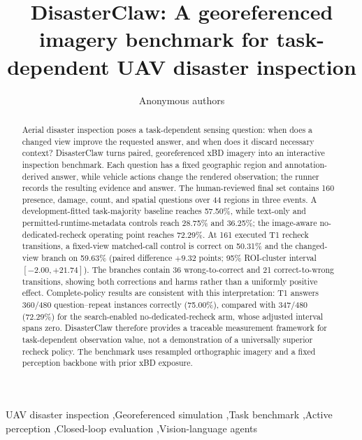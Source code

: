\documentclass[preprint,12pt,a4paper]{elsarticle}
\begin{document}
\begin{frontmatter}
\title{DisasterClaw: A georeferenced imagery benchmark for task-dependent UAV disaster inspection}
\author{Anonymous authors}
\begin{abstract}
Aerial disaster inspection poses a task-dependent sensing question: when does a changed view improve the requested answer, and when does it discard necessary context? DisasterClaw turns paired, georeferenced xBD imagery into an interactive inspection benchmark. Each question has a fixed geographic region and annotation-derived answer, while vehicle actions change the rendered observation; the runner records the resulting evidence and answer. The human-reviewed final set contains 160 presence, damage, count, and spatial questions over 44 regions in three events. A development-fitted task-majority baseline reaches 57.50\%, while text-only and permitted-runtime-metadata controls reach 28.75\% and 36.25\%; the image-aware no-dedicated-recheck operating point reaches 72.29\%. At 161 executed T1 recheck transitions, a fixed-view matched-call control is correct on 50.31\% and the changed-view branch on 59.63\% (paired difference $+9.32$ points; 95\% ROI-cluster interval $[-2.00,+21.74]$). The branches contain 36 wrong-to-correct and 21 correct-to-wrong transitions, showing both corrections and harms rather than a uniformly positive effect. Complete-policy results are consistent with this interpretation: T1 answers 360/480 question--repeat instances correctly (75.00\%), compared with 347/480 (72.29\%) for the search-enabled no-dedicated-recheck arm, whose adjusted interval spans zero. DisasterClaw therefore provides a traceable measurement framework for task-dependent observation value, not a demonstration of a universally superior recheck policy. The benchmark uses resampled orthographic imagery and a fixed perception backbone with prior xBD exposure.
\end{abstract}
\begin{keyword}
UAV disaster inspection \sep Georeferenced simulation \sep Task benchmark \sep Active perception \sep Closed-loop evaluation \sep Vision-language agents
\end{keyword}
\end{frontmatter}











\appendix
\setcounter{table}{0}
\renewcommand{\theHtable}{A.\arabic{table}}


\begingroup\small


\endgroup
\end{document}

